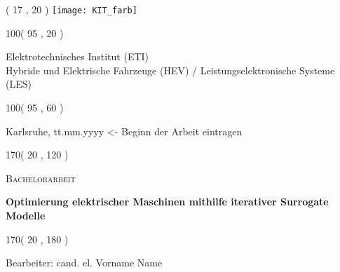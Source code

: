 %
%

\thispagestyle{empty}

\begin{textblock}{50}( 17 , 20 )
\texttt{[image: KIT\_farb]}
\end{textblock}

\begin{textblock}{100}( 95 , 20 )
\begin{flushright}
Elektrotechnisches Institut (ETI)\\
Hybride und Elektrische Fahrzeuge (HEV) / Leistungselektronische Systeme (LES)	%
\end{flushright}
\end{textblock}


\begin{textblock}{100}( 95 , 60 )
\begin{flushright}
\large
Karlsruhe, tt.mm.yyyy <- Beginn der Arbeit eintragen    				          	%
\end{flushright}
\end{textblock}

\begin{textblock}{170}( 20 , 120 )
\begin{center}
    \begin{LARGE}
    \textsc{Bachelorarbeit}\\										%
    \end{LARGE}
\vspace{0.5cm}
    \begin{huge}
    \textbf{Optimierung elektrischer Maschinen mithilfe iterativer Surrogate Modelle}\\[1cm]           									%
    \end{huge}
\end{center}
\end{textblock}

\begin{textblock}{170}( 20 , 180 )
\begin{center}
\large
Bearbeiter: cand. el. Vorname Name \\           									%
\end{center}
\end{textblock}

